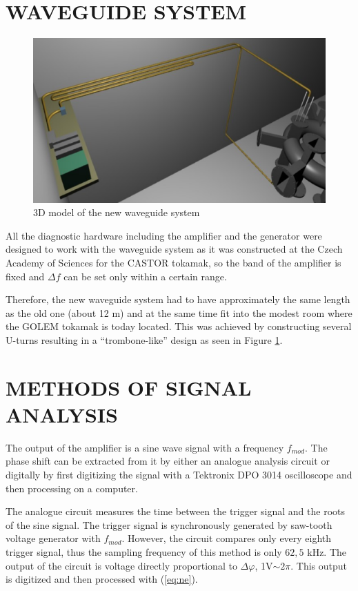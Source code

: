 \documentclass[a4paper,twoside]{articlek}
\begin{document}
\section{WAVEGUIDE SYSTEM}
\begin{figure}[b]
    \begin{center}
        \includegraphics[width=.45\textwidth]{vlnovody.eps}
    \end{center}
    \caption{3D model of the new waveguide system}
    \label{fig:ws}
\end{figure}
All the diagnostic hardware including the amplifier and the generator were designed to work with the waveguide system as it was constructed at the Czech Academy of Sciences for the CASTOR tokamak, so the band of the amplifier is fixed and $\Delta f$ can be set only within a certain range.

Therefore, the new waveguide system had to have approximately the same length as the old one (about 12 m) and at the same time fit into the modest room where the GOLEM tokamak is today located. 
This was achieved by constructing several U-turns resulting in a ``trombone-like'' design as seen in Figure \ref{fig:ws}.

\section{METHODS OF SIGNAL ANALYSIS}

The output of the amplifier is a sine wave signal with a frequency $f_{mod}$. The phase shift can be extracted from it by either an analogue analysis circuit or digitally by first digitizing the signal with a Tektronix DPO 3014 oscilloscope and then processing on a computer. 

The analogue circuit measures the time between the trigger signal and the roots of the sine signal. The trigger signal is synchronously generated by saw-tooth voltage generator with $f_{mod}$. However, the circuit compares only every eighth trigger signal, thus the sampling frequency of this method is only $62,5$ kHz. The output of the circuit is voltage directly proportional to $\Delta \varphi $, 1V$\sim 2\pi$. This output is digitized and then processed with (\ref{eq:ne}).
\end{document}
